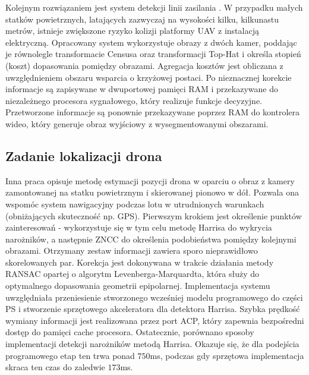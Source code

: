 Kolejnym rozwiązaniem jest system detekcji linii zasilania \cite{STEREOVISION3}. W przypadku małych statków powietrznych, latających zazwyczaj na wysokości kilku, kilkunastu metrów, istnieje zwiększone ryzyko kolizji platformy UAV z instalacją elektryczną. Opracowany system
wykorzystuje obrazy z dwóch kamer, poddając je równolegle transformacie Censusa oraz transformacji Top-Hat i określa stopień (koszt) dopasowania pomiędzy obrazami. Agregacja kosztów jest obliczana z uwzględnieniem obszaru wsparcia o krzyżowej postaci.%
Po nieznacznej korekcie informacje są zapisywane w dwuportowej pamięci RAM i przekazywane do niezależnego procesora sygnałowego, który realizuje funkcje decyzyjne.  Przetworzone informacje są ponownie przekazywane poprzez RAM do kontrolera wideo, który generuje obraz wyjściowy z wysegmentowanymi obszarami.


\subsection{Zadanie lokalizacji drona}
Inna praca opisuje metodę estymacji pozycji drona w oparciu o obraz z kamery zamontowanej na statku powietrznym i skierowanej pionowo w dół. Pozwala ona wspomóc system nawigacyjny podczas lotu w utrudnionych warunkach (obniżających skuteczność np. GPS). Pierwszym krokiem jest określenie punktów zainteresowań - wykorzystuje się w tym celu metodę Harrisa do wykrycia narożników, a następnie ZNCC do określenia podobieństwa pomiędzy kolejnymi obrazami. Otrzymany zestaw informacji zawiera sporo nieprawidłowo skorelowanych par. Korekcja jest dokonywana w trakcie działania metody RANSAC opartej o algorytm Levenberga-Marquardta, która służy do optymalnego dopasowania geometrii epipolarnej. Implementacja systemu uwzględniała przeniesienie stworzonego wcześniej modelu programowego do części PS i stworzenie sprzętowego akceleratora dla detektora Harrisa. Szybka prędkość wymiany informacji jest realizowana przez port ACP, który zapewnia bezpośredni dostęp do pamięci cache procesora. Ostatecznie, porównano sposoby implementacji detekcji narożników metodą Harrisa. Okazuje się, że dla podejścia programowego etap ten trwa ponad $750$ms, podczas gdy sprzętowa implementacja skraca ten czas do zaledwie $173$ms.